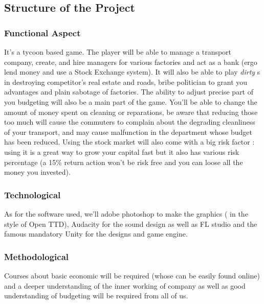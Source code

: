 \documentclass[a4paper, 11pt] {article}
\begin{document}
    \newpage

    \subsection{Structure of the Project}

    \subsubsection{Functional Aspect}

    \par
    It’s a tycoon based game. The player will be able to manage a transport company, create, and hire managers for various factories and act as a bank (ergo lend money and use a Stock Exchange system). It will also be able to play \textit{dirty} s in destroying competitor’s real estate and roads, bribe politician to grant you advantages and plain sabotage of factories.
The ability to adjust precise part of you budgeting will also be a main part of the game. You’ll be able to change the amount of money spent on cleaning or reparations, be aware that reducing those too much will cause the commuters to complain about the degrading cleanliness of your transport, and may cause malfunction in the department whose budget has been reduced. Using the stock market will also come with a big risk factor : using it is a great way to grow your capital fast but it also has
various risk percentage (a 15\% return action won’t be risk free and you can loose all the money you invested).\par

\subsubsection{Technological}

\par
As for the software used, we’ll adobe photoshop to make the graphics ( in the style of Open TTD), Audacity for the sound design as well as FL studio and the famous mandatory Unity for the designs and game engine.\par

\subsubsection{Methodological}

\par
Courses about basic economic will be required (whose can be easily found online) and a deeper understanding of the inner working of company as well as good understanding of budgeting will be required from all of us.\par
\end{document}
